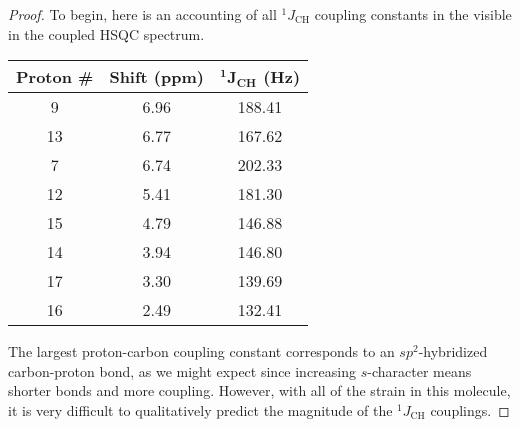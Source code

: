 \documentclass[../psets.tex]{subfiles}
\begin{document}
\begin{enumerate}
    \begin{proof}
        To begin, here is an accounting of all ${}^1J_\text{CH}$ coupling constants in the visible in the coupled HSQC spectrum.
        \begin{table}[H]
            \centering
            \small
            \renewcommand{\arraystretch}{1.2}
            \begin{tabular}{|c|c|c|}
                \toprule
                \textbf{Proton \#} & \textbf{Shift (ppm)} & $\bm{{}^1J_\textbf{CH}}$ \textbf{(Hz)}\\
                \midrule
                9  & 6.96 & 188.41\\
                13 & 6.77 & 167.62\\
                7  & 6.74 & 202.33\\
                12 & 5.41 & 181.30\\
                15 & 4.79 & 146.88\\
                14 & 3.94 & 146.80\\
                17 & 3.30 & 139.69\\
                16 & 2.49 & 132.41\\
                \bottomrule
            \end{tabular}
        \end{table}
        The largest proton-carbon coupling constant corresponds to an $sp^2$-hybridized carbon-proton bond, as we might expect since increasing $s$-character means shorter bonds and more coupling. However, with all of the strain in this molecule, it is very difficult to qualitatively predict the magnitude of the ${}^1J_\text{CH}$ couplings.
    \end{proof}
\end{enumerate}
\end{document}
